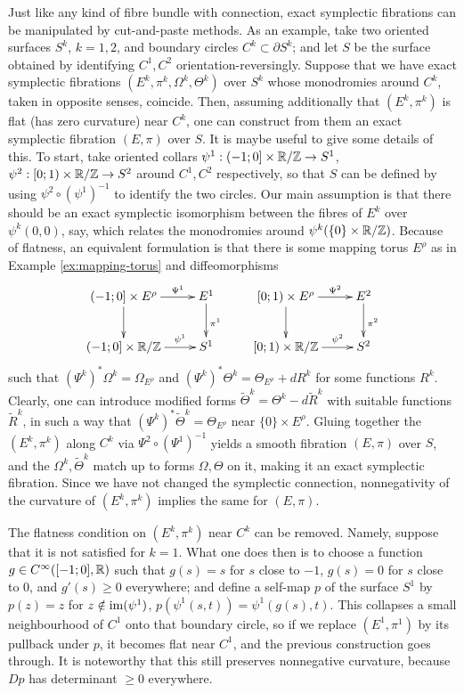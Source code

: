 \documentclass[10pt,letterpaper]{article}
\begin{document}
Just like any kind of fibre bundle with connection, exact symplectic fibrations
can be manipulated by cut-and-paste methods. As an example, take two oriented
surfaces $S^k$, $k = 1,2$, and boundary circles $C^k \subset \partial S^k$; and
let $S$ be the surface obtained by identifying $C^1,C^2$
orientation-reversingly. Suppose that we have exact symplectic fibrations
$(E^k,\pi^k,\Omega^k,\Theta^k)$ over $S^k$ whose monodromies around $C^k$,
taken in opposite senses, coincide. Then, assuming additionally that
$(E^k,\pi^k)$ is flat (has zero curvature) near $C^k$, one can construct from
them an exact symplectic fibration $(E,\pi)$ over $S$. It is maybe useful to
give some details of this. To start, take oriented collars $\psi^1: (-1;0]
\times \mathbb{R}/\mathbb{Z} \rightarrow S^1$, $\psi^2: [0;1) \times \mathbb{R}/\mathbb{Z} \rightarrow S^2$
around $C^1,C^2$ respectively, so that $S$ can be defined by using $\psi^2
\circ (\psi^1)^{-1}$ to identify the two circles. Our main assumption is that
there should be an exact symplectic isomorphism between the fibres of $E^k$
over $\psi^k(0,0)$, say, which relates the monodromies around $\psi^k(\{0\}
\times \mathbb{R}/\mathbb{Z})$. Because of flatness, an equivalent formulation is that there is
some mapping torus $E^\rho$ as in Example \ref{ex:mapping-torus} and
diffeomorphisms
\[
\xymatrix{
 {(-1;0] \times E^\rho} \ar[d] \ar[r]^-{\Psi^1} & {E^1} \ar[d]^{\pi^1} \\
 {(-1;0] \times \R/\Z} \ar[r]^-{\psi^1} & {S^1}
} \qquad \xymatrix{
 {[0;1) \times E^\rho} \ar[d] \ar[r]^-{\Psi^2} & {E^2} \ar[d]^{\pi^2} \\
 {[0;1) \times \R/\Z} \ar[r]^-{\psi^2} & {S^2}
}
\]
such that $(\Psi^k)^*\Omega^k = \Omega_{E^\rho}$ and $(\Psi^k)^*\Theta^k =
\Theta_{E^\rho} + dR^k$ for some functions $R^k$. Clearly, one can introduce
modified forms $\tilde{\Theta}^k = \Theta^k - d\tilde{R}^k$ with suitable
functions $\tilde{R}^k$, in such a way that $(\Psi^k)^*\tilde{\Theta}^k =
\Theta_{E^\rho}$ near $\{0\} \times E^\rho$. Gluing together the $(E^k,\pi^k)$
along $C^k$ via $\Psi^2 \circ (\Psi^1)^{-1}$ yields a smooth fibration
$(E,\pi)$ over $S$, and the $\Omega^k, \tilde{\Theta}^k$ match up to forms
$\Omega,\Theta$ on it, making it an exact symplectic fibration. Since we have
not changed the symplectic connection, nonnegativity of the curvature of
$(E^k,\pi^k)$ implies the same for $(E,\pi)$.

\begin{remark} \label{re:squeeze-boundary}
The flatness condition on $(E^k,\pi^k)$ near $C^k$ can be removed. Namely,
suppose that it is not satisfied for $k = 1$. What one does then is to choose a
function $g \in C^\infty([-1;0],\mathbb{R})$ such that $g(s) = s$ for $s$ close to $-1$,
$g(s) = 0$ for $s$ close to $0$, and $g'(s) \geq 0$ everywhere; and define a
self-map $p$ of the surface $S^1$ by $p(z) = z$ for $z \notin \mathrm{im}(\psi^1)$,
$p(\psi^1(s,t)) = \psi^1(g(s),t)$. This collapses a small neighbourhood of
$C^1$ onto that boundary circle, so if we replace $(E^1,\pi^1)$ by its pullback
under $p$, it becomes flat near $C^1$, and the previous construction goes
through. It is noteworthy that this still preserves nonnegative curvature,
because $Dp$ has determinant $\geq 0$ everywhere.
\end{remark}
\end{document}
